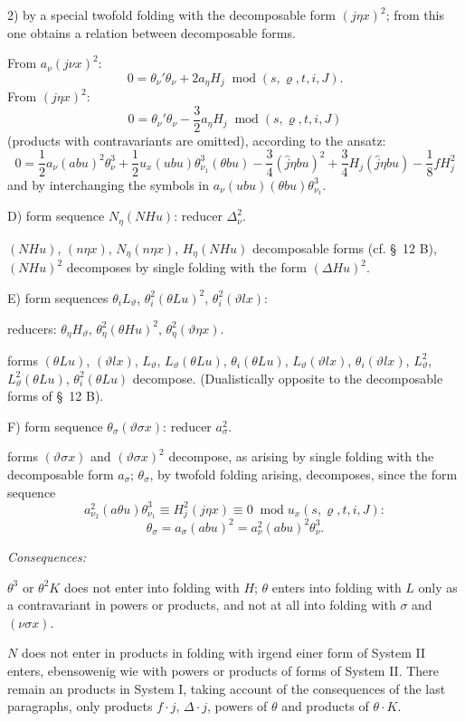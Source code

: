 \documentclass[11pt]{article}
\newcommand{\A}{\Delta}
\newcommand{\R}{\varrho}
\newcommand{\modu}[1]{\;\operatorname{mod} #1}
\providecommand{\modu}[1]{\;\operatorname{mod} #1}
\begin{document}
2) by a special twofold folding with the decomposable form $(j\eta x)^2$; from this one obtains a relation between decomposable forms.

From $a_\nu(j\nu x)^2$:
\[
0=\theta_\nu'\theta_\nu+2a_\eta H_j\modu{(s,\R,t,i,J)}.
\]
From $(j\eta x)^2$:
\[
0=\theta_\nu'\theta_\nu-\frac32a_\eta H_j\modu{(s,\R,t,i,J)}
\]
(products with contravariants are omitted), according to the ansatz:
\[
0=\frac12a_\nu(abu)^2\theta_\nu^3
+\frac12u_x(ubu)\theta_{\nu_1}^3(\theta bu)
-\frac34(\widehat{j}\eta bu)^2+\frac34H_j(\widehat{j}\eta bu)
-\frac18fH_j^2
\]
and by interchanging the symbols in $a_\nu(ubu)(\theta bu)\theta_{\nu_1}^3$.

\noindent D) form sequence $N_\eta(NHu)$: reducer $\A_\nu^2$.

$(NHu)$, $(n\eta x)$, $N_\eta(n\eta x)$, $H_\eta(NHu)$ decomposable forms (cf. \S\ 12 B), $(NHu)^2$ decomposes by single folding with the form $(\A Hu)^2$.

\noindent E) form sequences $\theta_iL_\vartheta$, $\theta_i^2(\theta Lu)^2$, $\theta_i^2(\vartheta lx)$:

reducers: $\theta_\eta H_\vartheta$, $\theta_\eta^2(\theta Hu)^2$, $\theta_\eta^2(\vartheta\eta x)$.

forms $(\theta Lu)$, $(\vartheta lx)$, $L_\vartheta$, $L_\vartheta(\theta Lu)$, $\theta_i(\theta Lu)$, $L_\vartheta(\vartheta lx)$, $\theta_i(\vartheta lx)$, $L_\vartheta^2$, $L_\vartheta^2(\theta Lu)$, $\theta_i^2(\theta Lu)$ decompose. (Dualistically opposite to the decomposable forms of \S\ 12 B).

\noindent F) form sequence $\theta_\sigma(\vartheta\sigma x)$: reducer $a_\sigma^2$.

forms $(\vartheta\sigma x)$ and $(\vartheta\sigma x)^2$ decompose, as arising by single folding with the decomposable form $a_\sigma$; $\theta_\sigma$, by twofold folding arising, decomposes, since the form sequence
\[
a_{\nu_2}^2(a\theta u)\theta_{\nu_1}^3\equiv H_j^2(j\eta x)\equiv0\modu{u_x(s,\R,t,i,J)}:
\]
\[
\theta_\sigma=a_\sigma(abu)^2=a_\nu^2(abu)^2\theta_\nu^3.
\]

\noindent\emph{Consequences:}

$\theta^3$ or $\theta^2K$ does not enter into folding with $H$; $\theta$ enters into folding with $L$ only as a contravariant in powers or products, and not at all into folding with $\sigma$ and $(\nu\sigma x)$.

$N$ does not enter in products in folding with irgend einer form of System II enters, ebensowenig wie with powers or products of forms of System II. There remain an products in System I, taking account of the consequences of the last paragraphs, only products $f\cdot j$, $\A\cdot j$, powers of $\theta$ and products of $\theta\cdot K$.
\end{document}
